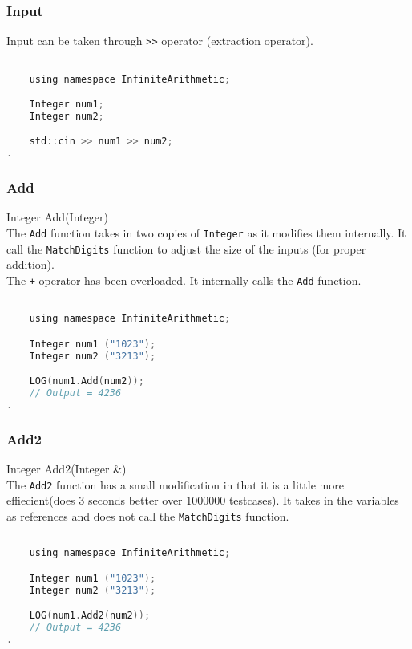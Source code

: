 \subsubsection{Input}
Input can be taken through \verb|>>| operator (extraction operator). 
\vspace*{1em}
\begin{lstlisting}[language = C]	

	using namespace InfiniteArithmetic;

	Integer num1;
	Integer num2;

	std::cin >> num1 >> num2;
.
\end{lstlisting}
\vspace*{1em}

\subsubsection{Add}
{\ttfamily \large Integer Add(Integer)} \\[2mm]
The \verb|Add| function takes in two copies of \verb|Integer| as it modifies them internally. It call the \verb|MatchDigits| function to adjust the size of the inputs (for proper addition). \\
The \verb|+| operator has been overloaded. It internally calls the \verb|Add| function.
\vspace*{1em}
\begin{lstlisting}[language = C]	

	using namespace InfiniteArithmetic;

	Integer num1 ("1023");
	Integer num2 ("3213");

	LOG(num1.Add(num2));
	// Output = 4236
.
\end{lstlisting}
\vspace*{1em}

\subsubsection{Add2}
{\ttfamily \large Integer Add2(Integer \&)} \\[2mm]
The \verb|Add2| function has a small modification in that it is a little more effiecient(does $3$ seconds better over $1000000$ testcases). It takes in the variables as references and does not call the \verb|MatchDigits| function.
\vspace*{1em}
\begin{lstlisting}[language = C]	
	
	using namespace InfiniteArithmetic;

	Integer num1 ("1023");
	Integer num2 ("3213");

	LOG(num1.Add2(num2));
	// Output = 4236
.
\end{lstlisting}
\vspace*{1em}


